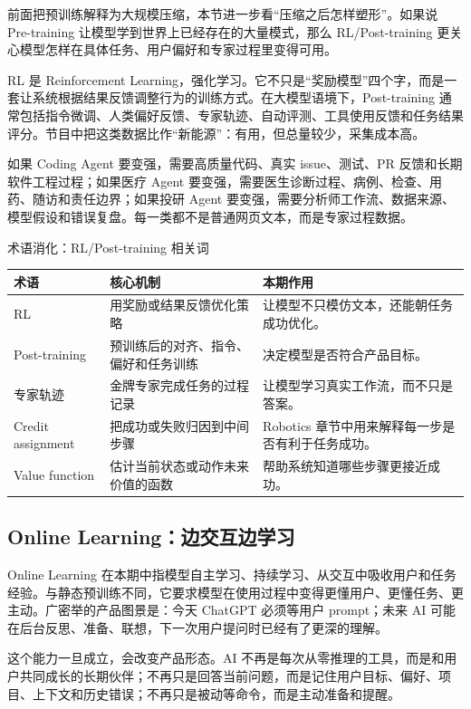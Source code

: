 \documentclass[a4paper]{article}
\begin{document}
前面把预训练解释为大规模压缩，本节进一步看“压缩之后怎样塑形”。如果说 Pre-training 让模型学到世界上已经存在的大量模式，那么 RL/Post-training 更关心模型怎样在具体任务、用户偏好和专家过程里变得可用。

RL 是 Reinforcement Learning，强化学习。它不只是“奖励模型”四个字，而是一套让系统根据结果反馈调整行为的训练方式。在大模型语境下，Post-training 通常包括指令微调、人类偏好反馈、专家轨迹、自动评测、工具使用反馈和任务结果评分。节目中把这类数据比作“新能源”：有用，但总量较少，采集成本高。

如果 Coding Agent 要变强，需要高质量代码、真实 issue、测试、PR 反馈和长期软件工程过程；如果医疗 Agent 要变强，需要医生诊断过程、病例、检查、用药、随访和责任边界；如果投研 Agent 要变强，需要分析师工作流、数据来源、模型假设和错误复盘。每一类都不是普通网页文本，而是专家过程数据。

\begin{knowledgebox}{术语消化：RL/Post-training 相关词}
\begin{tabularx}{\textwidth}{p{}p{}X}
\toprule
术语 & 核心机制 & 本期作用 \\
\midrule
RL & 用奖励或结果反馈优化策略 & 让模型不只模仿文本，还能朝任务成功优化。 \\
Post-training & 预训练后的对齐、指令、偏好和任务训练 & 决定模型是否符合产品目标。 \\
专家轨迹 & 金牌专家完成任务的过程记录 & 让模型学习真实工作流，而不只是答案。 \\
Credit assignment & 把成功或失败归因到中间步骤 & Robotics 章节中用来解释每一步是否有利于任务成功。 \\
Value function & 估计当前状态或动作未来价值的函数 & 帮助系统知道哪些步骤更接近成功。 \\
\bottomrule
\end{tabularx}
\end{knowledgebox}

\subsection{Online Learning：边交互边学习}

Online Learning 在本期中指模型自主学习、持续学习、从交互中吸收用户和任务经验。与静态预训练不同，它要求模型在使用过程中变得更懂用户、更懂任务、更主动。广密举的产品图景是：今天 ChatGPT 必须等用户 prompt；未来 AI 可能在后台反思、准备、联想，下一次用户提问时已经有了更深的理解。

这个能力一旦成立，会改变产品形态。AI 不再是每次从零推理的工具，而是和用户共同成长的长期伙伴；不再只是回答当前问题，而是记住用户目标、偏好、项目、上下文和历史错误；不再只是被动等命令，而是主动准备和提醒。
\end{document}

